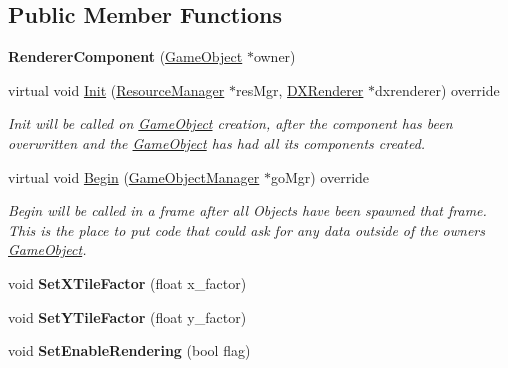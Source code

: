\subsection*{Public Member Functions}
\begin{DoxyCompactItemize}
\item 
\mbox{\label{classRendererComponent_ae7145f3c02a50108603e0a2ac93f4fdc}} 
{\bfseries Renderer\+Component} (\hyperlink{classGameObject}{Game\+Object} $\ast$owner)
\item 
virtual void \hyperlink{classRendererComponent_aa6ae449d8ab701dc0eb20d1a8879765f}{Init} (\hyperlink{classResourceManager}{Resource\+Manager} $\ast$res\+Mgr, \hyperlink{classDXRenderer}{D\+X\+Renderer} $\ast$dxrenderer) override
\begin{DoxyCompactList}\small\item\em Init will be called on \hyperlink{classGameObject}{Game\+Object} creation, after the component has been overwritten and the \hyperlink{classGameObject}{Game\+Object} has had all its components created. \end{DoxyCompactList}\item 
virtual void \hyperlink{classRendererComponent_a169372f7e5068ad4095923c694372d7f}{Begin} (\hyperlink{classGameObjectManager}{Game\+Object\+Manager} $\ast$go\+Mgr) override
\begin{DoxyCompactList}\small\item\em Begin will be called in a frame after all Objects have been spawned that frame. This is the place to put code that could ask for any data outside of the owner\textquotesingle{}s \hyperlink{classGameObject}{Game\+Object}. \end{DoxyCompactList}\item 
\mbox{\label{classRendererComponent_ac048cad5c196178d33226f65ba48c846}} 
void {\bfseries Set\+X\+Tile\+Factor} (float x\+\_\+factor)
\item 
\mbox{\label{classRendererComponent_ab0480d2d8405095b06329a55258a9982}} 
void {\bfseries Set\+Y\+Tile\+Factor} (float y\+\_\+factor)
\item 
\mbox{\label{classRendererComponent_ae7c493bb10f407d9bc877c1ed6cece5f}} 
void {\bfseries Set\+Enable\+Rendering} (bool flag)
\end{DoxyCompactItemize}
